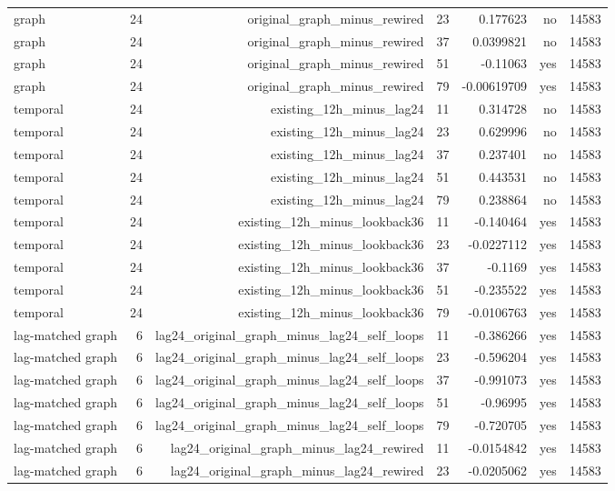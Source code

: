 \begin{tabular}{lrrrrrr}
graph & 24 & original\_graph\_minus\_rewired & 23 & 0.177623 & no & 14583 \\
graph & 24 & original\_graph\_minus\_rewired & 37 & 0.0399821 & no & 14583 \\
graph & 24 & original\_graph\_minus\_rewired & 51 & -0.11063 & yes & 14583 \\
graph & 24 & original\_graph\_minus\_rewired & 79 & -0.00619709 & yes & 14583 \\
temporal & 24 & existing\_12h\_minus\_lag24 & 11 & 0.314728 & no & 14583 \\
temporal & 24 & existing\_12h\_minus\_lag24 & 23 & 0.629996 & no & 14583 \\
temporal & 24 & existing\_12h\_minus\_lag24 & 37 & 0.237401 & no & 14583 \\
temporal & 24 & existing\_12h\_minus\_lag24 & 51 & 0.443531 & no & 14583 \\
temporal & 24 & existing\_12h\_minus\_lag24 & 79 & 0.238864 & no & 14583 \\
temporal & 24 & existing\_12h\_minus\_lookback36 & 11 & -0.140464 & yes & 14583 \\
temporal & 24 & existing\_12h\_minus\_lookback36 & 23 & -0.0227112 & yes & 14583 \\
temporal & 24 & existing\_12h\_minus\_lookback36 & 37 & -0.1169 & yes & 14583 \\
temporal & 24 & existing\_12h\_minus\_lookback36 & 51 & -0.235522 & yes & 14583 \\
temporal & 24 & existing\_12h\_minus\_lookback36 & 79 & -0.0106763 & yes & 14583 \\
lag-matched graph & 6 & lag24\_original\_graph\_minus\_lag24\_self\_loops & 11 & -0.386266 & yes & 14583 \\
lag-matched graph & 6 & lag24\_original\_graph\_minus\_lag24\_self\_loops & 23 & -0.596204 & yes & 14583 \\
lag-matched graph & 6 & lag24\_original\_graph\_minus\_lag24\_self\_loops & 37 & -0.991073 & yes & 14583 \\
lag-matched graph & 6 & lag24\_original\_graph\_minus\_lag24\_self\_loops & 51 & -0.96995 & yes & 14583 \\
lag-matched graph & 6 & lag24\_original\_graph\_minus\_lag24\_self\_loops & 79 & -0.720705 & yes & 14583 \\
lag-matched graph & 6 & lag24\_original\_graph\_minus\_lag24\_rewired & 11 & -0.0154842 & yes & 14583 \\
lag-matched graph & 6 & lag24\_original\_graph\_minus\_lag24\_rewired & 23 & -0.0205062 & yes & 14583 \\

\end{tabular}
